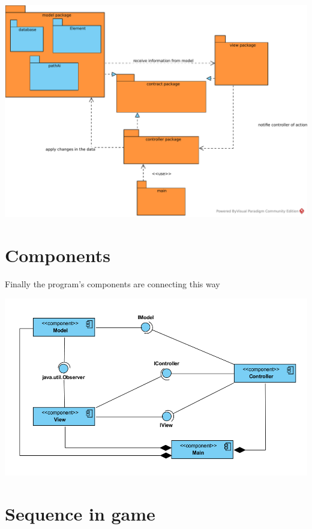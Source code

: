\documentclass{report}
\begin{document}
\begin{center}
\includegraphics[scale=0.8]{resources/SVG/package.pdf}
\end{center}

\clearpage

\section{Components}

Finally the program’s components are connecting this way

\begin{center}
\includegraphics[scale=0.7]{resources/components.png}
\end{center}

\section{Sequence in game}
\end{document}
